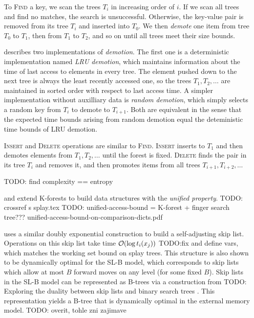 To \textsc{Find} a key, we scan the trees $T_i$ in increasing order of $i$.
If we scan all trees and find no matches, the search is unsuccessful.
Otherwise, the key-value pair is removed from its tree $T_i$ and inserted
into $T_0$. We then \emph{demote} one item from tree $T_0$ to $T_1$,
then from $T_1$ to $T_2$, and so on until all trees meet their size bounds.

\cite{martel} describes two implementations of \emph{demotion}.
The first one is a deterministic implementation named \emph{LRU demotion},
which maintains information about the time of last access to elements
in every tree. The element pushed down to the next tree is always the least
recently accessed one, so the trees $T_1,T_2,\ldots$ are maintained in sorted
order with respect to last access time.
A simpler implementation without auxilliary data is \emph{random demotion},
which simply selects a random key from $T_i$ to demote to $T_{i+1}$.
Both are equivalent in the sense that the expected time bounds arising
from random demotion equal the deteministic time bounds of LRU demotion.

\textsc{Insert} and \textsc{Delete} operations are similar to \textsc{Find}.
\textsc{Insert} inserts to $T_1$ and then demotes elements from $T_1,T_2,\ldots$
until the forest is fixed.
\textsc{Delete} finds the pair in its tree $T_i$ and removes it, and
then promotes items from all trees $T_{i+1},T_{i+2},\ldots$

TODO: find complexity == entropy

\cite{alternatives-to-splay-trees} and \cite{unified-access-bound} extend
K-forests to build data structures with the \emph{unified property}.
TODO: crossref s splay.tex
TODO: unified-access-bound = K-forest + finger search tree???
unified-access-bound-on-comparison-dicts.pdf

\cite{dynamic-optimality-for-sl} uses a similar doubly exponential construction
to build a self-adjusting skip list. Operations on this skip list take time
$\mathcal{O}(\log t_i(x_j))$ TODO:fix and define vars, which matches the working set
bound on splay trees. This structure is also shown to be dynamically optimal
for the SL-B model, which corresponds to skip lists which allow at most
$B$ forward moves on any level (for some fixed $B$). Skip lists in the
SL-B model can be represented as B-trees via a construction from
TODO: Exploring the duality between skip lists and binary search trees
. This representation yields a B-tree that is dynamically optimal
in the external memory model.
TODO: overit, tohle zni zajimave
